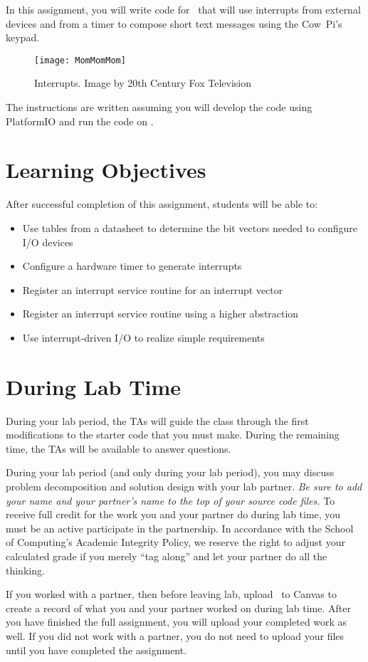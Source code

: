 In this assignment, you will write code for \runtimeenvironment\ that will use interrupts from external devices and from a timer to compose short text messages using the Cow~Pi's keypad.

\begin{figure}[h]
    \centering
    \texttt{[image: MomMomMom]}
    \caption{Interrupts. \tiny Image by 20th Century Fox Television}
\end{figure}

The instructions are written assuming you will develop the code using PlatformIO    %
and run the code on \runtimeenvironment.

\tableofcontents

\section*{Learning Objectives}

After successful completion of this assignment, students will be able to:
\begin{itemize}
    \item Use tables from a datasheet to determine the bit vectors needed to configure I/O devices
    \item Configure a hardware timer to generate interrupts
    \item Register an interrupt service routine for an interrupt vector
    \item Register an interrupt service routine using a higher abstraction
    \item Use interrupt-driven I/O to realize simple requirements
\end{itemize}

\section*{During Lab Time}

During your lab period, the TAs will guide the class through the first modifications to the starter code that you must make.
During the remaining time, the TAs will be available to answer questions.

During your lab period (and only during your lab period), you may discuss problem decomposition and solution design with your lab partner.
\textit{Be sure to add your name and your partner's name to the top of your source code files.}
To receive full credit for the work you and your partner do during lab time, you must be an active participate in the partnership.
In accordance with the School of Computing's Academic Integrity Policy, we reserve the right to adjust your calculated grade if you merely ``tag along'' and let your partner do all the thinking.

If you worked with a partner, then before leaving lab, upload \requiredfiles\ to Canvas to create a record of what you and your partner worked on during lab time.
After you have finished the full assignment, you will upload your completed work as well.
If you did not work with a partner, you do not need to upload your files until you have completed the assignment.